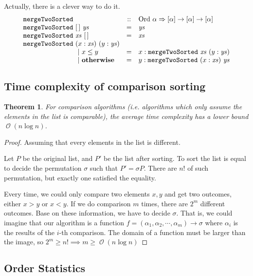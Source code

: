 \documentclass[12pt, a4paper]{article}
\newcommand{\opord}{\operatorname{\mathcal{O}}}
\newcommand{\ord}[1]{\opord\left(#1\right)}
\newtheorem{theorem}{Theorem}
\begin{document}
Actually, there is a clever way to do it.
\[
  \begin{array}{lcl}
    \mathtt{mergeTwoSorted} & :: & \text{Ord } \alpha \Rightarrow [\alpha] \to [\alpha] \to [\alpha] \\
    \mathtt{mergeTwoSorted} \  [\,] \  \mathit{ys} & = & \mathit{ys} \\
    \mathtt{mergeTwoSorted} \  \mathit{xs} \  [\,] & = & \mathit{xs} \\
    \mathtt{mergeTwoSorted} \  (x:\mathit{xs}) \  (y:\mathit{ys}) & & \\
    \hspace*{80pt} | \ x \leq y & = & x : \mathtt{mergeTwoSorted} \ \mathit{xs} \ (y:\mathit{ys}) \\
    \hspace*{80pt} | \ \text{\bf otherwise} & = & y : \mathtt{mergeTwoSorted} \ (x:\mathit{xs}) \ \mathit{ys} \\
  \end{array}
\]

\subsection{Time complexity of comparison sorting}
\begin{theorem}
For comparison algorithms (i.e. algorithms which only assume the elements in the list is 
comparable), the average time complexity has a lower bound $\ord{n \log n}$.
\end{theorem}


\begin{proof}
  Assuming that every elements in the list is different. 

  Let $P$ be the original list, and $P'$ be the list after sorting. To sort the list
  is equal to decide the permutation $\sigma$ such that $P' = \sigma P$.
  There are $n!$ of such permutation, but exactly one satisfied the equality.

  Every time, we could only compare two elements $x, y$ and get two outcomes,
  either $x > y$ or $x < y$. If we do comparison $m$ times, there are $2^m$
  different outcomes. Base on these information, we have to decide $\sigma$. That is, 
  we could imagine that our algorithm is a function $f = (\alpha_1, \alpha_2, \cdots, \alpha_m) \to \sigma$
  where $\alpha_i$ is the results of the $i$-th comparison. The domain of a function must be larger
  than the image, so $2^m \geq n! \implies m \geq \ord{n \log n}$
\end{proof}

\subsection{Order Statistics}
\end{document}
